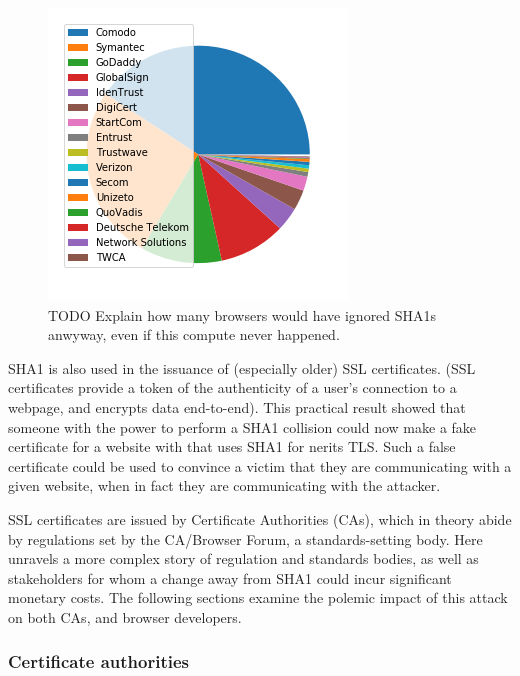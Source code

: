 \documentclass[sigconf]{acmart}
\begin{document}
\begin{figure}[t!]
\centering
\includegraphics[width=.9\linewidth]{./figures/ca-share.png}
\caption{TODO Explain how many browsers would have ignored SHA1s anwyway, even if this compute never happened.}
\end{figure}

SHA1 is also used in the issuance of (especially older) SSL certificates.
(SSL certificates
provide a token of the authenticity of a user's connection to a webpage,
and encrypts data end-to-end).
This practical result showed that someone with the power to perform a SHA1 collision could
now make a fake certificate for a website with that uses SHA1 for nerits TLS.
Such a false certificate could
be used to convince a victim that they are communicating with a given website,
when in fact they are communicating with the attacker.

SSL certificates are issued by Certificate Authorities (CAs), which in theory abide by 
regulations set by the CA/Browser Forum, a standards-setting body.
Here unravels a more complex story of regulation and standards bodies,
as well as stakeholders for whom a change away from SHA1 could incur significant monetary costs.
The following sections examine the polemic impact of this attack on both CAs, and browser developers. 

\subsubsection{Certificate authorities}
\label{sec:org2ec61e3}
\end{document}
